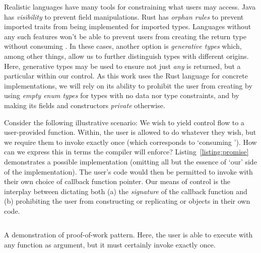 Realistic languages have many tools for constraining what users may access. Java has \textit{visibility} to prevent field manipulations. Rust has \textit{orphan rules} to prevent imported traits from being implemented for imported types. Languages without any such features won't be able to prevent users from creating the return type  without consuming . In these cases, another option is \textit{generative types} which, among other things, allow us to further distinguish types with different origins. Here, generative types may be used to ensure not just \textit{any}  is returned, but a particular  within our control. As this work uses the Rust language for concrete implementations, we will rely on its ability to prohibit the user from creating  by using \textit{empty enum types} for types with no data nor type constraints, and by making its fields and constructors \textit{private} otherwise\cite{exotic_sizes}.

Consider the following illustrative scenario: We wish to yield control flow to a user-provided function. Within, the user is allowed to do whatever they wish, but we require them to invoke   exactly once (which corresponds to `consuming '). How can we express this in terms the compiler will enforce? Listing~\ref{listing:promise} demonstrates a possible implementation (omitting all but the essence of `our' side of the implementation). The user's code would then be permitted to invoke  with their own choice of callback function pointer. Our means of control is the interplay between dictating both (a)
the \textit{signature} of the callback function and (b) prohibiting the user from constructing or replicating  or  objects in their own code.

\begin{listing}[ht]
	\inputminted[]{rust}{promise.rs}
	\caption[Proof of work pattern example of `promises'.]{A demonstration of proof-of-work pattern. Here, the user is able to execute  with any function as argument, but it must certainly invoke  exactly once.}
	\label{listing:promise}
\end{listing}
